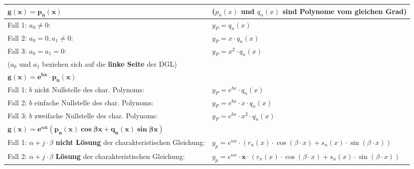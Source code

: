 \begin{table}[h!]
\begin{center}
\renewcommand{\arraystretch}{1.1}
\begin{tabularx}{\textwidth}{|p{270pt}|X|}
	\hline 	$\mathbf{g(x)=p_n(x)}$ & 
		($p_n(x)$ und $q_n(x)$ sind Polynome vom gleichen Grad)\\

	 \hline	Fall 1: $a_0\neq 0$:          & $y_P = q_n(x)$\\
		Fall 2: $a_0 = 0 , a_1\neq 0$:& $y_P=x\cdot q_n(x)$\\
		Fall 3: $a_0=a_1=0$:          & $y_P=x^2\cdot q_n(x)$\\
		($a_0$ und $a_1$ beziehen sich auf die \textbf{linke Seite} der DGL) & \\
	\hline
	\hline
 		$\mathbf{g(x)=e^{bx}\cdot p_n(x)}$ & \\
	\hline	Fall 1: $b$ nicht Nullstelle des char. Polynoms:    &
		$y_P=e^{bx}\cdot q_n(x)$\\
		Fall 2: $b$ einfache Nullstelle des char. Polynoms: &
		$y_P=e^{bx}\cdot x \cdot q_n(x)$\\
		Fall 3: $b$ zweifache Nullstelle des char. Polynoms:&
		$y_P=e^{bx}\cdot x^2\cdot q_n(x)$\\
	\hline
	\hline
		$\mathbf{g(x) = e^{\alpha x}(p_n(x)\cos \beta x + q_n(x)\sin \beta x)}$ & \\
	 \hline	Fall 1: $\alpha + j\cdot\beta$ \textbf{nicht Lösung} der charakteristischen Gleichung: &
		$y_p = e^{\alpha x}\cdot(r_n(x)\cdot\cos(\beta \cdot x) + s_n(x)\cdot\sin( \beta\cdot x))$ \\
		Fall 2: $\alpha + j\cdot\beta$ \textbf{Lösung} der charakteristischen Gleichung: &
		$y_p = e^{\alpha x}\cdot \textbf{x} \cdot(r_n(x) \cdot \cos(\beta\cdot x) + s_n(x) \cdot\sin(\beta\cdot x))$\\
	\hline
\end{tabularx}
\renewcommand{\arraystretch}{2}
\end{center}
\end{table}	


